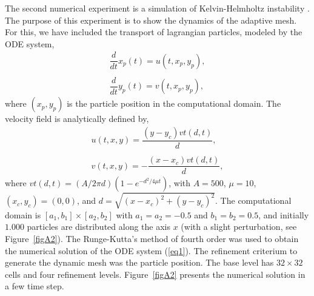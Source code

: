 \documentclass[review]{elsarticle}
\begin{document}
The second numerical experiment is a simulation of Kelvin-Helmholtz instability \cite{DUA13,CEC10}. The purpose of this experiment is to show the dynamics of the adaptive mesh. For this, we have included the transport of lagrangian particles, modeled by the ODE system,
\begin{equation}\label{eq1}
 \begin{array}{l}
    \dfrac{d}{dt}x_p(t) = u(t,x_p,y_p),\\ \\%
    \dfrac{d}{dt}y_p(t) = v(t,x_p,y_p),%
  \end{array}
\end{equation}
where $(x_p,y_p)$ is the particle position in the computational domain. The velocity field is analytically defined by,
\begin{equation}\label{eq2}
  \begin{array}{l}
    u(t,x,y) = \dfrac{(y-y_c)vt(d,t)}{d},\\ \\
    v(t,x,y) = -\dfrac{(x-x_c)vt(d,t)}{d},
  \end{array}
\end{equation}
where $vt(d,t) = (A/2\pi d)(1 - e^{-d^2/4\mu t})$, with $A = 500$, $\mu = 10$, $(x_c,y_c)=(0,0)$, and $d=\sqrt{(x-x_c)^2+(y-y_c)^2}$.  The computational domain is $[a_1,b_1]\times[a_2,b_2]$ with $a_1=a_2=-0.5$ and $b_1=b_2=0.5$, and initially $1.000$ particles are distributed along the axis $x$ (with a slight perturbation, see Figure~\ref{figA2}). The Runge-Kutta's method of fourth order was used to obtain the numerical solution of the ODE system (\ref{eq1}). The refinement criterium to generate the dynamic mesh was the particle position. The base level has $32\times32$ cells and four refinement levels. Figure~\ref{figA2} presents the numerical solution in a few time step.   
\end{document}
